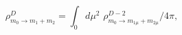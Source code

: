 \begin{equation}
 \rho^D_{m_0\rightarrow m_1+m_2}=\int_0 d\mu^2\,\,
 \rho^{D-2}_{m_0\rightarrow m_{1\mu}+m_{2\mu}}/4\pi,
\end{equation}

